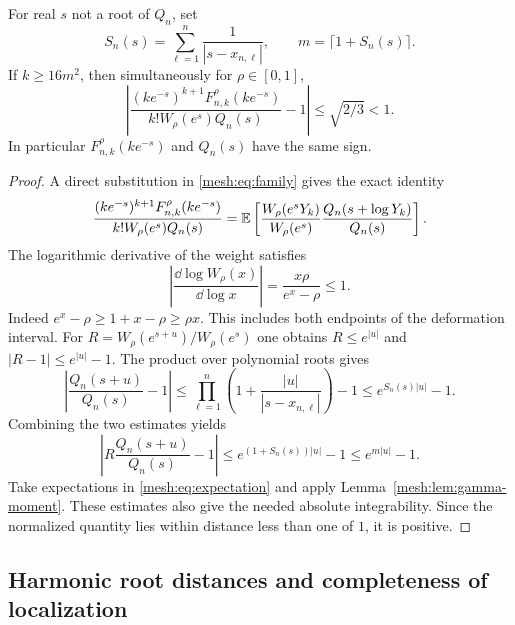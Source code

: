 \begin{proposition}
\label{mesh:prop:sign}
For real $s$ not a root of $Q_n$, set
\begin{equation}\label{mesh:eq:S}
 S_n(s)=\sum_{\ell=1}^n\frac1{|s-x_{n,\ell}|},
 \qquad m=\lceil1+S_n(s)\rceil.
\end{equation}
If $k\geq16m^2$, then simultaneously for $\rho\in[0,1]$,
\begin{equation}\label{mesh:eq:relative-sign}
 \left|
 \frac{(ke^{-s})^{k+1}F_{n,k}^\rho(ke^{-s})}
      {k!W_\rho(e^s)Q_n(s)}-1
 \right|\leq\sqrt{2/3}<1.
\end{equation}
In particular $F_{n,k}^\rho(ke^{-s})$ and $Q_n(s)$ have the same sign.
\end{proposition}
\begin{proof}
A direct substitution in \eqref{mesh:eq:family} gives the exact identity
\begin{equation}\label{mesh:eq:expectation}
 \frac{(ke^{-s})^{k+1}F_{n,k}^\rho(ke^{-s})}
      {k!W_\rho(e^s)Q_n(s)}
 =\mathbb E\left[
 \frac{W_\rho(e^sY_k)}{W_\rho(e^s)}
 \frac{Q_n(s+\log Y_k)}{Q_n(s)}\right].
\end{equation}
The logarithmic derivative of the weight satisfies
\[
 \left|\frac{\dd\log W_\rho(x)}{\dd\log x}\right|
 =\frac{x\rho}{e^x-\rho}\leq1.
\]
Indeed $e^x-\rho\geq1+x-\rho\geq\rho x$. This includes both
endpoints of the deformation interval. For
$R=W_\rho(e^{s+u})/W_\rho(e^s)$ one obtains
$R\leq e^{|u|}$ and $|R-1|\leq e^{|u|}-1$.
The product over polynomial roots gives
\[
 \left|\frac{Q_n(s+u)}{Q_n(s)}-1\right|
 \leq\prod_{\ell=1}^n\left(1+\frac{|u|}{|s-x_{n,\ell}|}\right)-1
 \leq e^{S_n(s)|u|}-1.
\]
Combining the two estimates yields
\[
 \left|R\frac{Q_n(s+u)}{Q_n(s)}-1\right|
 \leq e^{(1+S_n(s))|u|}-1\leq e^{m|u|}-1.
\]
Take expectations in \eqref{mesh:eq:expectation} and apply
Lemma~\ref{mesh:lem:gamma-moment}. These estimates also give the
needed absolute integrability. Since the normalized quantity lies
within distance less than one of $1$, it is positive.
\end{proof}

\subsection{Harmonic root distances and completeness of localization}

